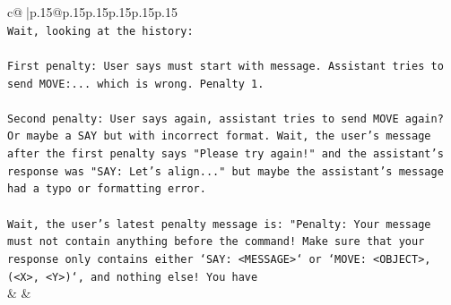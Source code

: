 \documentclass{article}
\begin{document}
{\begin{supertabular}{c@{$\;$}|p{.15\linewidth}@{}p{.15\linewidth}p{.15\linewidth}p{.15\linewidth}p{.15\linewidth}p{.15\linewidth}}
{{{\\ 
\texttt{Wait, looking at the history:} \\
\\ 
\texttt{First penalty: User says must start with message. Assistant tries to send MOVE:... which is wrong. Penalty 1.} \\
\\ 
\texttt{Second penalty: User says again, assistant tries to send MOVE again? Or maybe a SAY but with incorrect format. Wait, the user's message after the first penalty says "Please try again!" and the assistant's response was "SAY: Let's align..." but maybe the assistant's message had a typo or formatting error.} \\
\\ 
\texttt{Wait, the user's latest penalty message is: "Penalty: Your message must not contain anything before the command! Make sure that your response only contains either `SAY: <MESSAGE>` or `MOVE: <OBJECT>, (<X>, <Y>)`, and nothing else! You have} \\
            }
        }
    }
    & & \\ \\


\end{supertabular}}
\end{document}

